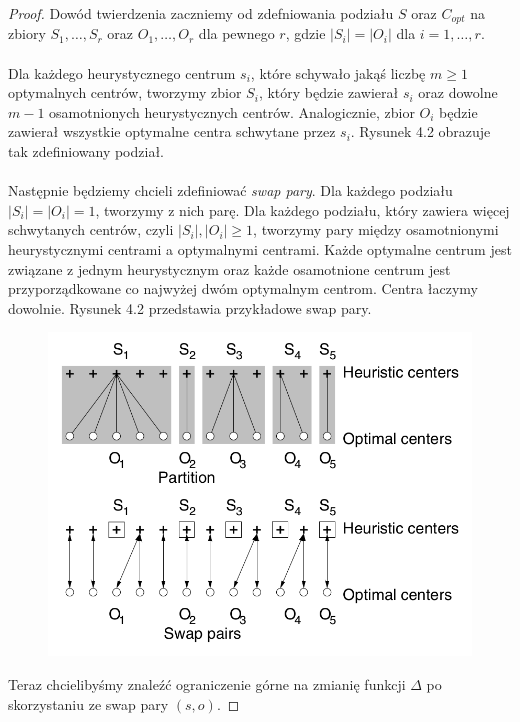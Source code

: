 \begin{proof}
    Dowód twierdzenia zaczniemy od zdefniowania podziału $S$ oraz $C_{opt}$ na zbiory $S_{1}, \dots, S_{r}$ oraz $O_{1}, \dots, O_{r}$ dla pewnego $r$, gdzie $|S_{i}| = |O_{i}|$ dla $i = 1, \dots, r$.
    \\~\\
    Dla każdego heurystycznego centrum $s_{i}$, które schywało jakąś liczbę $m \geq 1$ optymalnych centrów, tworzymy zbior $S_{i}$, który będzie zawierał $s_{i}$ oraz dowolne $m-1$ osamotnionych heurystycznych centrów.
    Analogicznie, zbior $O_{i}$ będzie zawierał wszystkie optymalne centra schwytane przez $s_{i}$.
    Rysunek 4.2 obrazuje tak zdefiniowany podział.
    \\~\\
    \noindent
    Następnie będziemy chcieli zdefiniować \textit{swap pary}.
    Dla każdego podziału $|S_{i}| = |O_{i}| = 1$, tworzymy z nich parę.
    Dla każdego podziału, który zawiera więcej schwytanych centrów, czyli $|S_{i}|, |O_{i}| \geq 1$, tworzymy pary między osamotnionymi heurystycznymi centrami a optymalnymi centrami.
    Każde optymalne centrum jest związane z jednym heurystycznym oraz każde osamotnione centrum jest przyporządkowane co najwyżej dwóm optymalnym centrom.
    Centra łaczymy dowolnie. 
    Rysunek 4.2 przedstawia przykładowe swap pary.
    \begin{figure}[H]
        \centering
        \includegraphics[totalheight=8cm]{swap.png}
        \caption{}
    \end{figure}
    Teraz chcielibyśmy znaleźć ograniczenie górne na zmianię funkcji $\Delta$ po skorzystaniu ze swap pary $(s, o)$.

\end{proof}
